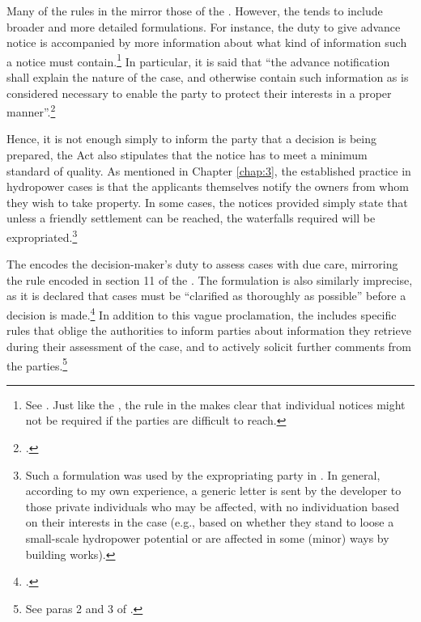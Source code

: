 {Many of the rules in the \cite{paa67} mirror those of the \cite{ea59}. However, the \cite{paa67} tends to include broader and more detailed formulations. For instance, the duty to give advance notice is accompanied by more information about what kind of information such a notice must contain.\footnote{See \cite[16]{paa67}. Just like the \cite{ea59}, the rule in the \cite{paa67} makes clear that individual notices might not be required if the parties are difficult to reach.} In particular, it is said that ``the advance notification shall explain the nature of the case, and otherwise contain such information as is considered necessary to enable the party to protect their interests in a proper manner''.\footcite[16]{paa67} 

Hence, it is not enough simply to inform the party that a decision is being prepared, the Act also stipulates that the notice has to meet a minimum standard of quality. As mentioned in Chapter \ref{chap:3}, the established practice in hydropower cases is that the applicants themselves notify the owners from whom they wish to take property. In some cases, the notices provided simply state that unless a friendly settlement can be reached, the waterfalls required will be expropriated.\footnote{Such a formulation was used by the expropriating party in \cite{sauda09}. In general, according to my own experience, a generic letter is sent by the developer to those private individuals who may be affected, with no individuation based on their interests in the case (e.g., based on whether they stand to loose a small-scale hydropower potential or  are affected in some (minor) ways by building works).} %

The \cite{paa67} encodes the decision-maker's duty to assess cases with due care, mirroring the rule encoded in section 11 of the \cite{ea59}. The formulation is also similarly imprecise, as it is declared that cases must be ``clarified as thoroughly as possible'' before a decision is made.\footcite[17]{paa67} In addition to this vague proclamation, the \cite{paa67} includes specific rules that oblige the authorities to inform parties about information they retrieve during their assessment of the case, and to actively solicit further comments from the parties.\footnote{See paras 2 and 3 of \cite[17]{paa67}.}

}
